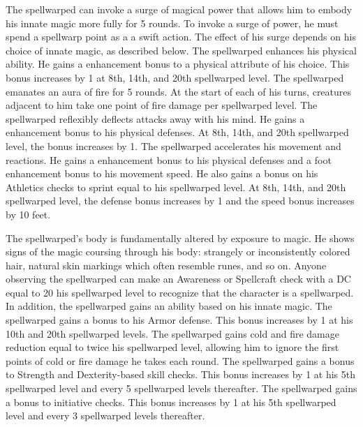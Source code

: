 The spellwarped can invoke a surge of magical power that allows him to embody his innate magic more fully for 5 rounds.
To invoke a surge of power, he must spend a spellwarp point as a a swift action.
The effect of his surge depends on his choice of innate magic, as described below.
The spellwarped enhances his physical ability.
He gains a  enhancement bonus to a physical attribute of his choice.
This bonus increases by 1 at 8th, 14th, and 20th spellwarped level.
The spellwarped emanates an aura of fire for 5 rounds.
At the start of each of his turns, creatures adjacent to him take one point of fire damage per spellwarped level.
The spellwarped reflexibly deflects attacks away with his mind.
He gains a  enhancement bonus to his physical defenses.
At 8th, 14th, and 20th spellwarped level, the bonus increases by 1.
The spellwarped accelerates his movement and reactions.
He gains a  enhancement bonus to his physical defenses and a  foot enhancement bonus to his movement speed.
He also gains a bonus on his Athletics checks to sprint equal to his spellwarped level.
At 8th, 14th, and 20th spellwarped level, the defense bonus increases by 1 and the speed bonus increases by 10 feet.

The spellwarped's body is fundamentally altered by exposure to magic.
He shows signs of the magic coursing through his body: strangely or inconsistently colored hair, natural skin markings which often resemble runes, and so on.
Anyone observing the spellwarped can make an Awareness or Spellcraft check with a DC equal to 20 \sub his spellwarped level to recognize that the character is a spellwarped.
In addition, the spellwarped gains an ability based on his innate magic.
The spellwarped gains a  bonus to his Armor defense.
This bonus increases by 1 at his 10th and 20th spellwarped levels.
The spellwarped gains cold and fire damage reduction equal to twice his spellwarped level, allowing him to ignore the first points of cold or fire damage he takes each round.
The spellwarped gains a  bonus to Strength and Dexterity-based skill checks.
This bonus increases by 1 at his 5th spellwarped level and every 5 spellwarped levels thereafter.
The spellwarped gains a  bonus to initiative checks.
This bonus increases by 1 at his 5th spellwarped level and every 3 spellwarped levels thereafter.


